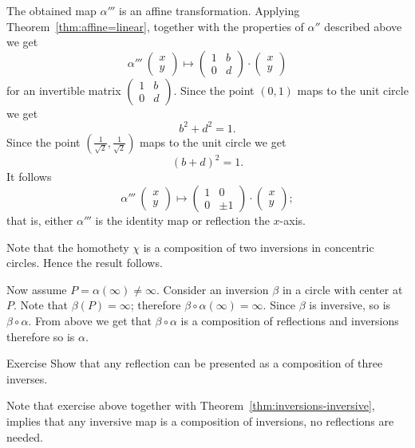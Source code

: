 The obtained map $\alpha'''$ is an affine transformation.
Applying Theorem~\ref{thm:affine=linear}, together with the properties of $\alpha''$ described above we get
\[\alpha'''\:\left(\begin{smallmatrix}
x\\ y
\end{smallmatrix} \right)
  \mapsto
  \left(\begin{smallmatrix}
1&b\\ 0&d
\end{smallmatrix} \right)
  \cdot
  \left(\begin{smallmatrix}
x\\ y
\end{smallmatrix} \right)
\]
for an invertible matrix $\left(\begin{smallmatrix}
1&b\\ 0&d
\end{smallmatrix} \right)$.
Since the point $(0,1)$ maps to the unit circle we get 
\[b^2+d^2=1.\]
Since the point $(\tfrac1{\sqrt{2}},\tfrac1{\sqrt{2}})$ maps to the unit circle we get 
\[(b+d)^2=1.\]
It follows 
\[\alpha'''\:\left(\begin{smallmatrix}
x\\ y
\end{smallmatrix} \right)
  \mapsto
  \left(\begin{smallmatrix}
1&0\\ 0&\pm1
\end{smallmatrix} \right)
  \cdot
  \left(\begin{smallmatrix}
x\\ y
\end{smallmatrix} \right);
\]
that is, either $\alpha'''$ is the identity map 
or reflection the $x$-axis.

Note that the homothety $\chi$ is a composition of two inversions in concentric circles.
Hence the result follows.

Now assume $P=\alpha(\infty)\ne \infty$.
Consider an inversion $\beta$ in a circle with center at $P$.
Note that $\beta(P)=\infty$; therefore $\beta\circ\alpha(\infty)=\infty$.
Since $\beta$ is inversive, so is $\beta\circ\alpha$.
From above we get that $\beta\circ\alpha$ is a composition of reflections and inversions therefore so is $\alpha$.
\qeds

\begin{thm}{Exercise}\label{ex:reflection/inversive}
Show that any reflection can be presented as a composition of three inverses. 
\end{thm}

Note that exercise above together with Theorem~\ref{thm:inversions-inversive},
implies that any inversive map is a composition of inversions,
no reflections are needed.

